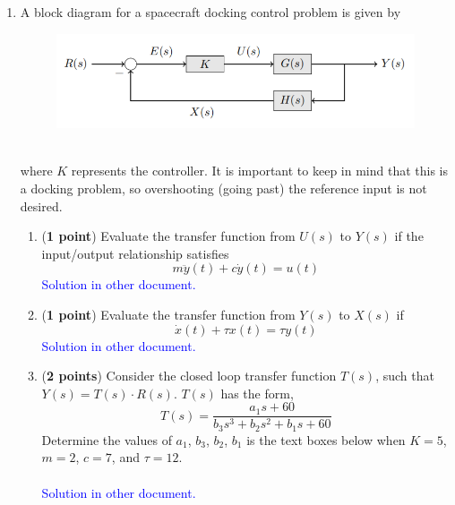 \documentclass[]{article}
\begin{document}
\begin{enumerate}

    \item A block diagram for a spacecraft docking control problem is given by
    \begin{figure}[h]
        \includegraphics[scale=0.8,center]{AERO_422_HW3_P1.png}
    \end{figure}
    \\where $K$ represents the controller. It is important to keep in mind that this is a docking problem, so overshooting (going past) the reference input is not desired.

    \begin{enumerate}
        \item (\textbf{1 point}) Evaluate the transfer function from $U(s)$ to $Y(s)$ if the input/output relationship satisfies
        $$m\ddot{y}(t) + c\dot{y}(t) = u(t)$$
        \textcolor{blue}{
        Solution in other document.
        }

        \item (\textbf{1 point}) Evaluate the transfer function from $Y(s)$ to $X(s)$ if
        $$\dot{x}(t) + \tau x(t) = \tau y(t)$$
        \textcolor{blue}{
        Solution in other document.
        }

        \item (\textbf{2 points}) Consider the closed loop transfer function $T(s)$, such that $Y(s) = T(s) \cdot R(s)$. $T(s)$ has the form, 
        $$T(s) = \frac{a_1s + 60}{b_3s^3 + b_2s^2 + b_1s + 60}$$        
        Determine the values of $a_1$, $b_3$, $b_2$, $b_1$ is the text boxes below when
        $K = 5$, $m = 2$, $c = 7$, and $\tau = 12$.\\\\
        \textcolor{blue}{
        Solution in other document.
        }
    \end{enumerate}

\end{enumerate}
\end{document}
